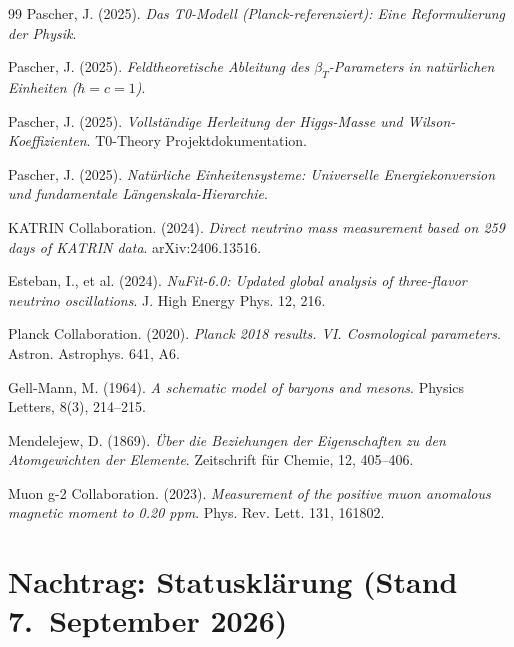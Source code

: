 \begin{thebibliography}{99}
	Pascher, J. (2025). \textit{Das T0-Modell (Planck-referenziert): Eine Reformulierung der Physik}.  
	
	Pascher, J. (2025). \textit{Feldtheoretische Ableitung des $\beta_T$-Parameters in natürlichen Einheiten ($\hbar = c = 1$)}.  
	
	Pascher, J. (2025). \textit{Vollständige Herleitung der Higgs-Masse und Wilson-Koeffizienten}. T0-Theory Projektdokumentation.
	
	Pascher, J. (2025). \textit{Natürliche Einheitensysteme: Universelle Energiekonversion und fundamentale Längenskala-Hierarchie}.  
	
	KATRIN Collaboration. (2024). \textit{Direct neutrino mass measurement based on 259 days of KATRIN data}. arXiv:2406.13516.
	
	Esteban, I., et al. (2024). \textit{NuFit-6.0: Updated global analysis of three-flavor neutrino oscillations}. J. High Energy Phys. 12, 216.
	
	Planck Collaboration. (2020). \textit{Planck 2018 results. VI. Cosmological parameters}. Astron. Astrophys. 641, A6.
	
	Gell-Mann, M. (1964). \textit{A schematic model of baryons and mesons}. Physics Letters, 8(3), 214--215.
	
	Mendelejew, D. (1869). \textit{Über die Beziehungen der Eigenschaften zu den Atomgewichten der Elemente}. Zeitschrift für Chemie, 12, 405--406.
	
	Muon g-2 Collaboration. (2023). \textit{Measurement of the positive muon anomalous magnetic moment to 0.20 ppm}. Phys. Rev. Lett. 131, 161802.
	
\end{thebibliography}

\section*{Nachtrag: Statusklärung (Stand 7.~September 2026)}

